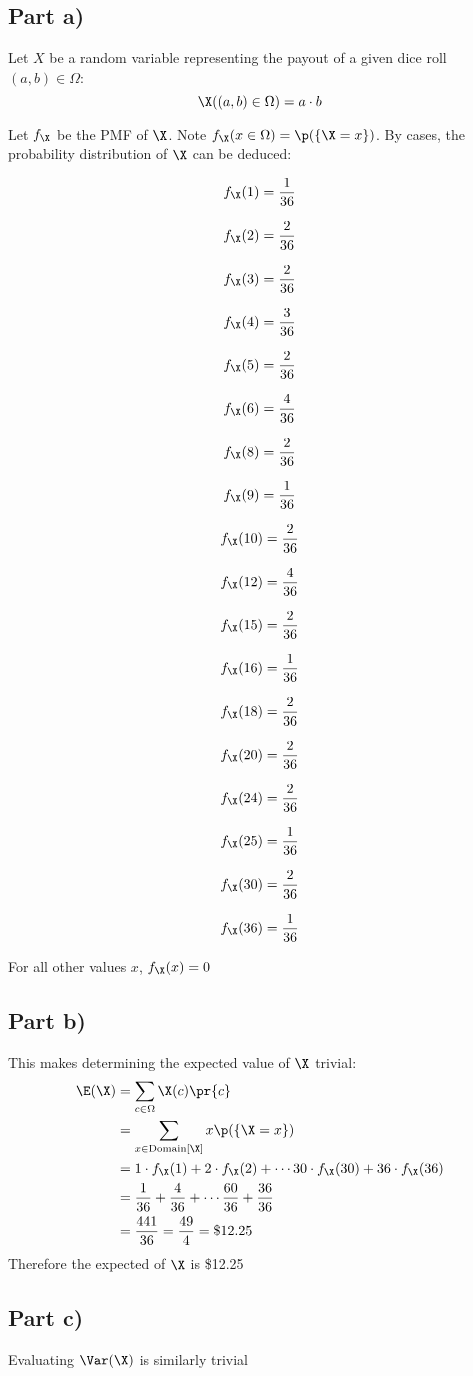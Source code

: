 \subsection*{Part a)}

Let $X$ be a random variable representing the payout of a given dice roll $(a,b)\in \Omega$:
\[
\X ((a,b) \in \Omega) = a \cdot b
\]


Let $f_{\X}$ be the PMF of $\X$. Note $f_{\X}(x \in \Omega) = \p (\{ \X = x \})$. By cases, the probability distribution of $\X$ can be deduced:
\newcommand{\pq}[2]{
	\[f_{\X}(#1) = \frac{#2}{36}\]
}

\begin{multicols}{3}

\pq{1}{1}
\pq{2}{2}
\pq{3}{2}
\pq{4}{3}
\pq{5}{2}
\pq{6}{4}
\pq{8}{2}
\pq{9}{1}
\pq{10}{2}
\pq{12}{4}
\pq{15}{2}
\pq{16}{1}
\pq{18}{2}
\pq{20}{2}
\pq{24}{2}
\pq{25}{1}
\pq{30}{2}
\pq{36}{1}

\end{multicols}

For all other values $x$, $f_{\X}(x) = 0$

\subsection*{Part b)}

This makes determining the expected value of $\X$ trivial:
\begin{align*}
\E (\X) &= \sum _{c \in \Omega} \X (c) \pr{c} \\
&= \sum _{x \in \mathrm{Domain}[\X]} x \p (\{ \X = x\}) \\
&= 1 \cdot f_{\X} (1) + 2 \cdot f_{\X}(2) + \cdots 30 \cdot f_{\X}(30) + 36 \cdot f_{\X}(36) \\
&= \frac{1}{36} + \frac{4}{36} + \cdots \frac{60}{36} + \frac{36}{36} \\
&= \frac{441}{36} = \frac{49}{4} = \$12.25
\end{align*}
Therefore the expected of $\X$ is \$12.25

\subsection*{Part c)}

Evaluating $\Var(\X)$ is similarly trivial

